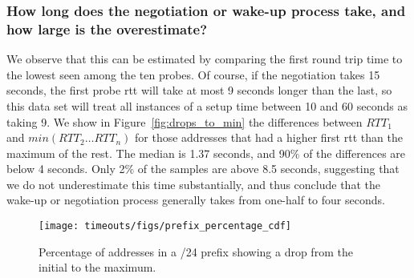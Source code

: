 \subsubsection*{How long does the negotiation or wake-up process take, and how 
large is the overestimate?}  We observe that this can be
estimated by comparing the first round trip time to the lowest 
seen among the ten probes.  Of course, if the negotiation takes
15 seconds, the first probe rtt will take at most 9 seconds 
longer than the last, so this data set will treat all instances of
a setup time between 10 and 60 seconds as taking 9. We show in Figure~\ref{fig:drops_to_min}
the differences between $RTT_1$ and $min(RTT_2 \ldots RTT_n)$
for those \countDropsToMedianAndToMax{} addresses that had a higher 
first rtt than the maximum of the rest.  The median is 1.37 seconds, and 90\% of the
differences are below 4 seconds.  Only 2\% of the samples are above 8.5 seconds,
suggesting that we do not underestimate this time substantially, and thus conclude
that the wake-up or negotiation process generally takes from one-half to four seconds.

\begin{figure}[tb]
\begin{center}
\texttt{[image: timeouts/figs/prefix\_percentage\_cdf]}
\end{center}
\caption[Percentage of addresses in a /24 prefix showing 
  a drop from the initial to the maximum]{\label{fig:prefix_percentage_cdf}Percentage of addresses in a /24 prefix showing 
  a drop from the initial to the maximum.}
\end{figure}
